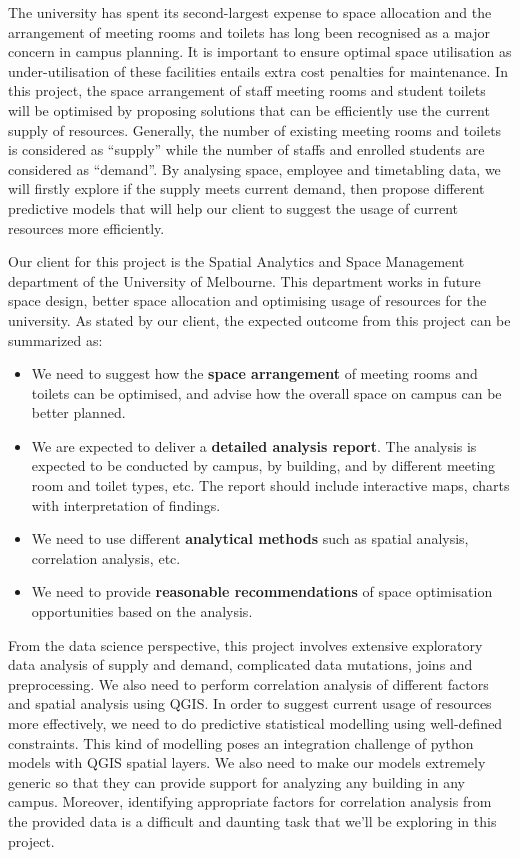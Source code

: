 The university has spent its second-largest expense to space allocation and the arrangement of meeting rooms and toilets has long been recognised as a major concern in campus planning. It is important to ensure optimal space utilisation as under-utilisation of these facilities entails extra cost penalties for maintenance. In this project, the space arrangement of staff meeting rooms and student toilets will be optimised by proposing solutions that can be efficiently use the current supply of resources. Generally, the number of existing meeting rooms and toilets is considered as “supply” while the number of staffs and enrolled students are considered as “demand”. By analysing space, employee and timetabling data, we will firstly explore if the supply meets current demand, then propose different predictive models that will help our client to suggest the usage of current resources more efficiently.

Our client for this project is the Spatial Analytics and Space Management department of the University of Melbourne. This department works in future space design, better space allocation and optimising usage of resources for the university. As stated by our client, the expected outcome from this project can be summarized as:
\vspace{-2mm}
\begin{itemize}
    \item We need to suggest how the \textbf{space arrangement} of meeting rooms and toilets can be optimised, and advise how the overall space on campus can be better planned.
    \vspace{-2mm}
    \item We are expected to deliver a \textbf{detailed analysis report}. The analysis is expected to be conducted by campus, by building, and by different meeting room and toilet types, etc. The report should include interactive maps, charts with interpretation of findings.
    \vspace{-2mm}
    \item We need to use different \textbf{analytical methods} such as spatial analysis, correlation analysis, etc.
    \vspace{-10mm}
    \item We need to provide \textbf{reasonable recommendations} of space optimisation opportunities based on the analysis.
\end{itemize}
\vspace{-2mm}
From the data science perspective, this project involves extensive exploratory data analysis of supply and demand, complicated data mutations, joins and preprocessing. We also need to perform correlation analysis of different factors and spatial analysis using QGIS. In order to suggest current usage of resources more effectively, we need to do predictive statistical modelling using well-defined constraints. This kind of modelling poses an integration challenge of python models with QGIS spatial layers. We also need to make our models extremely generic so that they can provide support for analyzing any building in any campus. Moreover, identifying appropriate factors for correlation analysis from the provided data is a difficult and daunting task that we'll be exploring in this project.

